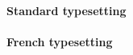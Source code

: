 \documentclass[varwidth, border = 3pt]{standalone}
\begin{document}
\begin{multicols}{2}
  \paragraph{Standard typesetting}
  \leavevmode

  \example{(}{)}

  \paragraph{French typesetting}
  \leavevmode

  \example{]}{[}
\end{multicols}
\end{document}
